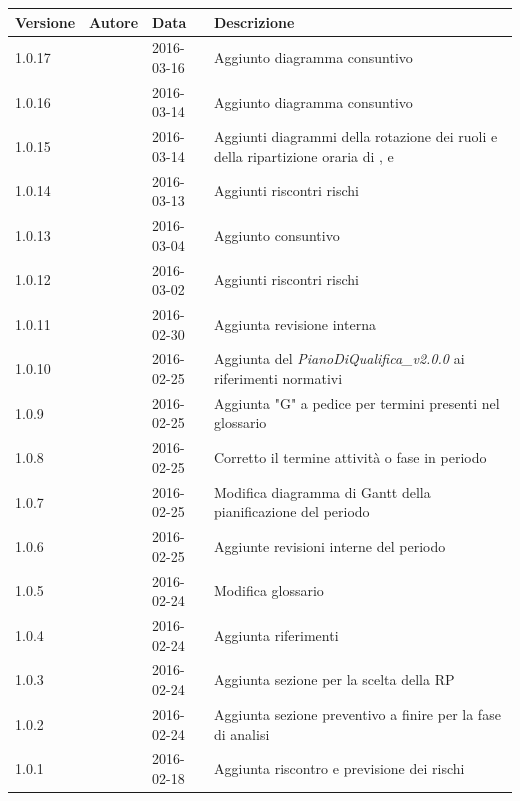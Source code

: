 \documentclass[12pt,a4paper]{article}
\begin{document}
\begin{center}
	\begin{longtable}[H]{p{} p{} p{} p{}}
		\toprule
		\textbf{Versione}	&	\textbf{Autore}	&	\textbf{Data}	&	\textbf{Descrizione}\\*
		\midrule
		\midrule
		1.0.17 & \AB{} & 2016-03-16 & Aggiunto diagramma consuntivo \FPA \\*
		\midrule
		1.0.16 & \AB{} & 2016-03-14 & Aggiunto diagramma consuntivo \FAD \\*
		\midrule
	    1.0.15 & \AB{} & 2016-03-14 & Aggiunti diagrammi della rotazione dei ruoli e della ripartizione oraria di \FAD, \FPA e \FPD{} \\*
        \midrule
        1.0.14 & \AB{} & 2016-03-13 & Aggiunti riscontri rischi \FPA{} \\*
        \midrule
        1.0.13 & \AB{} & 2016-03-04 & Aggiunto consuntivo \FAD{} \\*
        \midrule
        1.0.12 & \AB{} & 2016-03-02 & Aggiunti riscontri rischi \FAD{} \\*
        \midrule
        1.0.11 & \AB{} & 2016-02-30 & Aggiunta revisione interna \\*
		\midrule
		1.0.10 & \AVE{} & 2016-02-25 & Aggiunta del \textit{PianoDiQualifica\_v2.0.0} ai riferimenti normativi \\*		
		\midrule
		1.0.9 & \AVE{} & 2016-02-25 & Aggiunta "G" a pedice per termini presenti nel glossario \\*
		\midrule
		1.0.8 & \AVE{} & 2016-02-25 & Corretto il termine attività o fase in periodo \\*
		\midrule
		1.0.7 & \AB{} & 2016-02-25 & Modifica diagramma di Gantt della pianificazione del periodo \FP\  \\*
		\midrule
		1.0.6 & \AB{} & 2016-02-25 & Aggiunte revisioni interne del periodo \FP\ \\*
		\midrule
		1.0.5 & \AB{} & 2016-02-24 & Modifica glossario \\*
		\midrule
		1.0.4 & \AB{} & 2016-02-24 & Aggiunta riferimenti \\*
		\midrule
		1.0.3 & \TP{} & 2016-02-24 & Aggiunta sezione per la scelta della RP \\*
		\midrule
		1.0.2 & \TP{} & 2016-02-24 & Aggiunta sezione preventivo a finire per la fase di analisi \\*
		\midrule
		1.0.1 & \TP{} & 2016-02-18 & Aggiunta riscontro e previsione dei rischi \\*

\end{longtable}
\end{center}
\end{document}
